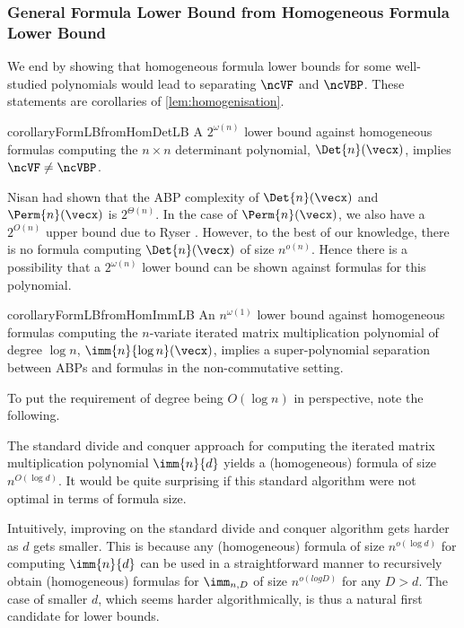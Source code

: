 %
%
%
%
%
%

%
%
%
%

%
%

\subsubsection*{General Formula Lower Bound from Homogeneous Formula Lower Bound}

We end by showing that homogeneous formula lower bounds for some well-studied polynomials would lead to separating $\ncVF$ and $\ncVBP$.
These statements are corollaries of \autoref{lem:homogenisation}.

\begin{restatable}{corollary}{FormLBfromHomDetLB}\label{cor:FormLBfromHomDetLB}
	A $2^{\omega(n)}$ lower bound against homogeneous formulas computing the $n \times n$ determinant polynomial, $\Det{n}(\vecx)$, implies $\ncVF \neq \ncVBP$.
\end{restatable}

\begin{remark}
	Nisan \cite{N91} had shown that the ABP complexity of $\Det{n}(\vecx)$ and $\Perm{n}(\vecx)$ is $2^{\Theta(n)}$. 
	In the case of $\Perm{n}(\vecx)$, we also have a $2^{O(n)}$ upper bound due to Ryser \cite{R63}.
	However, to the best of our knowledge, there is no formula computing $\Det{n}(\vecx)$ of size $n^{o(n)}$. 
	Hence there is a possibility that a $2^{\omega(n)}$ lower bound can be shown against formulas for this polynomial.
\end{remark}

\begin{restatable}{corollary}{FormLBfromHomImmLB}\label{cor:FormLBfromHomImmLB}
	An $n^{\omega(1)}$ lower bound against homogeneous formulas computing the $n$-variate iterated matrix multiplication polynomial of degree $\log n$, $\imm{n}{\log n}(\vecx)$, implies a super-polynomial separation between ABPs and formulas in the non-commutative setting.
\end{restatable}

\noindent To put the requirement of degree being $O(\log n)$ in perspective, note the following.

\begin{remark}
	The standard divide and conquer approach for computing the iterated matrix multiplication polynomial $\imm{n}{d}$ yields a (homogeneous) formula of size $n^{O(\log d)}$. 
	It would be quite surprising if this standard algorithm were not optimal in terms of formula size.

	Intuitively, improving on the standard divide and conquer algorithm gets harder as $d$ gets smaller. 
	This is because any (homogeneous) formula of size $n^{o(\log d)}$ for computing $\imm{n}{d}$ can be used in a straightforward manner to recursively obtain (homogeneous) formulas for $\imm_{n,D}$ of size $n^{o(logD)}$ for any $D > d$. 
	The case of smaller $d$, which seems harder algorithmically, is thus a natural first candidate for lower bounds.
\end{remark}

